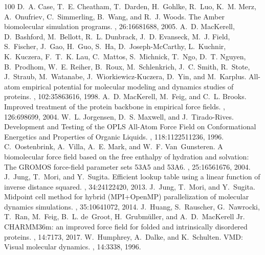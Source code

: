 \documentclass[a4paper,11pt,oneside,english]{sphinxmanual}
\begin{document}
\begin{sphinxthebibliography}{100}
D. A. Case, T. E. Cheatham, T. Darden, H. Gohlke, R. Luo, K. M. Merz, A. Onufriev, C. Simmerling, B. Wang, and R. J. Woods. The Amber biomolecular simulation programs. , 26:1668\textendash{}1688, 2005.
A. D. MacKerell, D. Bashford, M. Bellott, R. L. Dunbrack, J. D. Evanseck, M. J. Field, S. Fischer, J. Gao, H. Guo, S. Ha, D. Joseph-McCarthy, L. Kuchnir, K. Kuczera, F. T. K. Lau, C. Mattos, S. Michnick, T. Ngo, D. T. Nguyen, B. Prodhom, W. E. Reiher, B. Roux, M. Schlenkrich, J. C. Smith, R. Stote, J. Straub, M. Watanabe, J. Wiorkiewicz-Kuczera, D. Yin, and M. Karplus. All-atom empirical potential for molecular modeling and dynamics studies of proteins. , 102:3586\textendash{}3616, 1998.
A. D. MacKerell, M. Feig, and C. L. Brooks. Improved treatment of the protein backbone in empirical force fields. , 126:698\textendash{}699, 2004.
W. L. Jorgensen, D. S. Maxwell, and J. Tirado-Rives. Development and Testing of the OPLS All-Atom Force Field on Conformational Energetics and Properties of Organic Liquids. , 118:11225\textendash{}11236, 1996.
C. Oostenbrink, A. Villa, A. E. Mark, and W. F. Van Gunsteren. A biomolecular force field based on the free enthalpy of hydration and solvation: The GROMOS force-field parameter sets 53A5 and 53A6. , 25:1656\textendash{}1676, 2004.
J. Jung, T. Mori, and Y. Sugita. Efficient lookup table using a linear function of inverse distance squared. , 34:2412\textendash{}2420, 2013.
J. Jung, T. Mori, and Y. Sugita. Midpoint cell method for hybrid (MPI+OpenMP) parallelization of molecular dynamics simulations. , 35:1064\textendash{}1072, 2014.
J. Huang, S. Rauscher, G. Nawrocki, T. Ran, M. Feig, B. L. de Groot, H. Grubmüller, and A. D. MacKerell Jr. CHARMM36m: an improved force field for folded and intrinsically disordered proteins. , 14:71\textendash{}73, 2017.
W. Humphrey, A. Dalke, and K. Schulten. VMD: Visual molecular dynamics. , 14:33\textendash{}38, 1996.

\end{sphinxthebibliography}
\end{document}

